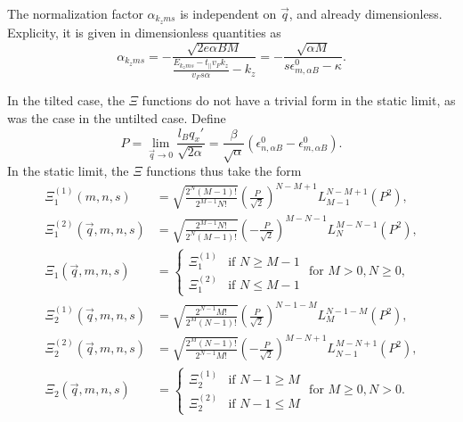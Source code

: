 The normalization factor \( \alpha_{k_z m s} \) is independent on \( \vec{q} \), and already dimensionless.
Explicity, it is given in dimensionless quantities as
\begin{equation}
  \alpha_{k_z m s} =
  -\frac{\sqrt{2 e \alpha B M}}{ \frac{E_{k_{z} m s} - t_{\parallel} v_F k_z}{v_{F} s \alpha } - k_z}
  = -\frac{\sqrt{\alpha M}}{s \epsilon ^{0}_{m, \alpha B} - \kappa }.
\end{equation}

In the tilted case, the \( \Xi \) functions do not have a trivial form in the static limit, as was the case in the untilted case.
Define
\[
P = \lim_{\vec{q} \to 0} \frac{l_B q_x'}{\sqrt{2 \alpha } } = \frac{\beta}{\sqrt{\alpha}} (\epsilon^0_{n, \alpha B} - \epsilon^0_{m, \alpha B}).
\]
In the static limit, the \( \Xi \) functions thus take the form
\begin{align}
  \Xi_1 ^{(1)}(m, n, s) &= \sqrt{\frac{2^N (M-1)!}{2^{M-1} N!}}
                                   \left( \frac{P}{\sqrt{2}} \right)^{N-M + 1}
                                   L^{N-M+1}_{M-1} \left( P^2 \right),\\
  \Xi_1 ^{(2)}(\vec{q}, m, n, s) &= \sqrt{\frac{2^{M-1} N!}{2^N (M-1)!}}
                                   \left( -\frac{P}{\sqrt{2}} \right)^{M-N - 1}
                                   L^{M - N - 1}_N \left( P^2 \right),\\
  \Xi_1(\vec{q}, m, n, s) &=
          \begin{cases}
            \Xi _1 ^{(1)} & \text{if } N \geq M-1\\
            \Xi _1 ^{(2)} & \text{if } N \leq M-1
          \end{cases} \text{ for } M>0, N \geq 0,
\end{align}
\begin{align}
  \Xi_2 ^{(1)}(\vec{q}, m, n, s) &= \sqrt{\frac{2^{N-1} M!}{2^M (N-1)!}}
                                   \left( \frac{P}{\sqrt{2}} \right)^{N-1 - M}
                                   L^{N-1 -M}_{M} \left( P^2 \right),\\
  \Xi_2 ^{(2)}(\vec{q}, m, n, s) &= \sqrt{\frac{2^M (N-1)!}{2^{N-1} M!}}
                                   \left( -\frac{P}{\sqrt{2}} \right)^{M-N + 1}
                                   L^{M - N + 1}_{N-1} \left( P^2 \right),\\
  \Xi_2(\vec{q}, m, n, s) &=
          \begin{cases}
            \Xi _2 ^{(1)} & \text{if } N-1 \geq M\\
            \Xi _2 ^{(2)} & \text{if } N-1 \leq M
          \end{cases} \text{ for } M \geq 0, N > 0.
\end{align}

